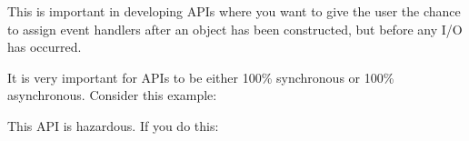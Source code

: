 This is important in developing APIs where you want to give the user the
chance to assign event handlers after an object has been constructed,
but before any I/O has occurred.

\begin{Shaded}
\begin{Highlighting}[]
 

  \NormalTok{(}\NormalTok{() \{}
    \NormalTok{();}
  \NormalTok{(}\NormalTok{));}
\NormalTok{\}}

  \NormalTok{();}
\NormalTok{();}

\end{Highlighting}
\end{Shaded}

It is very important for APIs to be either 100\% synchronous or 100\%
asynchronous. Consider this example:

\begin{Shaded}
\begin{Highlighting}[]
 
   
    \NormalTok{();}
    \NormalTok{;}
  \NormalTok{\}}

  \NormalTok{(}
\NormalTok{\}}
\end{Highlighting}
\end{Shaded}

This API is hazardous. If you do this:

\begin{Shaded}
\begin{Highlighting}[]
\NormalTok{(}\NormalTok{, }\NormalTok{() \{}
  \NormalTok{();}
\NormalTok{\});}
\NormalTok{();}
\end{Highlighting}
\end{Shaded}

